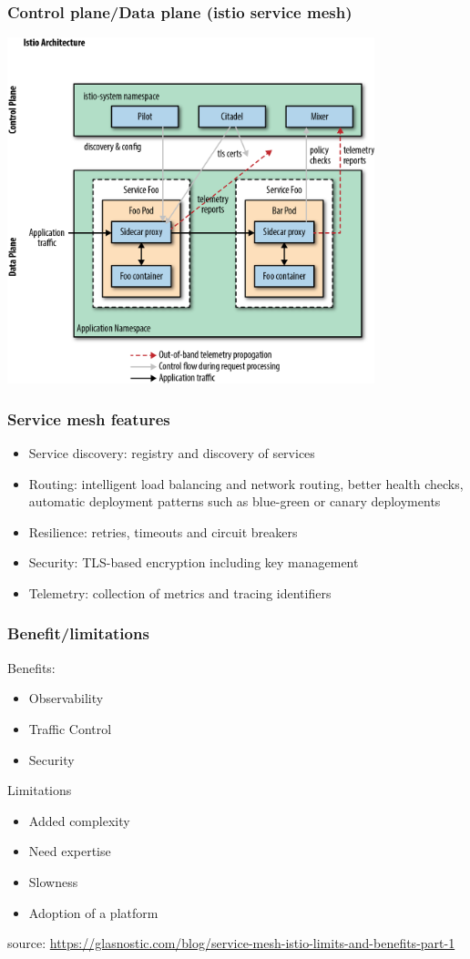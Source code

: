 \documentclass{beamer}
\begin{document}
\begin{frame}
  \frametitle{Control plane/Data plane (istio service mesh)}
  \center
  \includegraphics[width=0.8\textwidth]{images/istio-arch}
\end{frame}


\begin{frame}
  \frametitle{Service mesh features}
  \begin{itemize}
    \item  Service discovery: registry and discovery of services    
    \item  Routing: intelligent load balancing and network routing, better health checks, automatic deployment patterns such as blue-green or canary deployments
    \item Resilience: retries, timeouts and circuit breakers
    \item Security: TLS-based encryption including key management
    \item Telemetry: collection of metrics and tracing identifiers
  \end{itemize}
\end{frame}
\begin{frame}
  \frametitle{Benefit/limitations}
  
  Benefits:
  \begin{itemize}
    \item Observability
    \item Traffic Control    
    \item Security
  \end{itemize}
  
  Limitations
  \begin{itemize}
    \item Added complexity
    \item Need expertise
    \item Slowness
    \item Adoption of a platform
  \end{itemize}
  \tiny {source: \url{https://glasnostic.com/blog/service-mesh-istio-limits-and-benefits-part-1}}
\end{frame}
\end{document}
